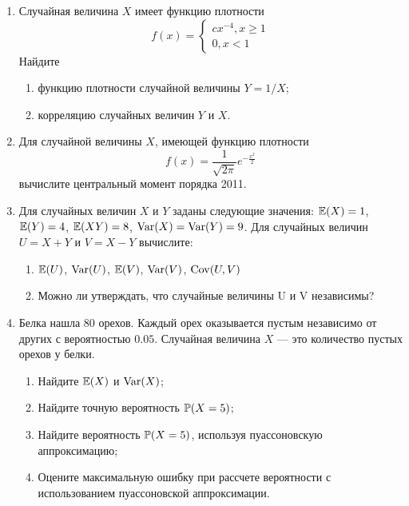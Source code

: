 \begin{enumerate}
\item Случайная величина $X$ имеет функцию плотности
\[
f(x)=
\begin{cases}
    cx^{-4}, x \geq 1 \\
    0, x<1
\end{cases}
\]
Найдите
\begin{enumerate}
\item функцию плотности случайной величины $Y = 1 / X$;
\item корреляцию случайных величин $Y$ и $X$.
\end{enumerate}

\item Для случайной величины $X$, имеющей функцию плотности
\[
f(x)=\frac{1}{\sqrt{2\pi}}e^{-\frac{x^2}{2}}
\]
вычислите центральный момент порядка 2011.

\item Для случайных величин $X$ и $Y$ заданы следующие значения: $\E(X) = 1$,
$\E(Y) = 4$, $\E(XY) = 8$, $\Var(X) = \Var(Y) = 9$. Для случайных величин $U = X + Y$
и $V = X - Y$ вычислите:
\begin{enumerate}
\item $\E(U)$, $\Var(U)$, $\E(V)$, $\Var(V)$, $\Cov(U,V)$
\item Можно ли утверждать, что случайные величины U и V независимы?
\end{enumerate}


\item Белка нашла 80 орехов. Каждый орех оказывается пустым независимо от других
с вероятностью $0.05$. Случайная величина $X$ — это количество пустых орехов у белки.
\begin{enumerate}
\item Найдите $\E(X)$ и $\Var(X)$;
\item Найдите точную вероятность $\P(X=5)$;
\item Найдите вероятность $\P(X=5)$, используя пуассоновскую аппроксимацию;
\item Оцените максимальную ошибку при рассчете вероятности с использованием
пуассоновской аппроксимации.
\end{enumerate}





\end{enumerate}
